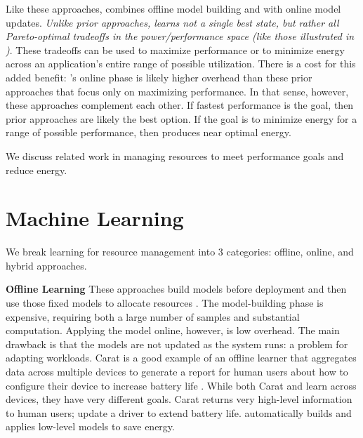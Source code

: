 Like these approaches, \SYSTEMLEO{} combines offline model building and
with online model updates.  \emph{Unlike prior approaches, \SYSTEMLEO{}
  learns not a single best state, but rather all Pareto-optimal
  tradeoffs in the power/performance space (like those illustrated in
  )}.  These tradeoffs can be used to maximize
performance or to minimize energy across an application's entire range
of possible utilization.  There is a cost for this added benefit:
\SYSTEMLEO{}'s online phase is likely higher overhead than these prior
approaches that focus only on maximizing performance.  In that sense,
however, these approaches complement each other.  If fastest
performance is the goal, then prior approaches are likely the best
option.  If the goal is to minimize energy for a range of possible
performance, then \SYSTEMLEO{} produces near optimal energy.


We discuss related work in managing resources to meet performance
goals and reduce energy.

\section{Machine Learning}
We break learning for resource management into 3 categories: offline,
online, and hybrid approaches.

\noindent \textbf{Offline Learning} These approaches build models
before deployment and then use those fixed models to allocate
resources
\cite{Yi2003,LeeBrooks2006,CPR,ChenJohn2011,petabricksStatic}.  The
model-building phase is expensive, requiring both a large number of
samples and substantial computation.  Applying the model online,
however, is low overhead.  The main drawback is that the models are
not updated as the system runs: a problem for adapting workloads.
  Carat is a good example of an
offline learner that aggregates data across multiple devices to
generate a report for human users about how to configure their device
to increase battery life \cite{carat}.  While both Carat and \SYSTEM{}
learn across devices, they have very different goals.  Carat returns
very high-level information to human users; \eg{} update a driver to
extend battery life.  \SYSTEM{} automatically builds and applies
low-level models to save energy.

